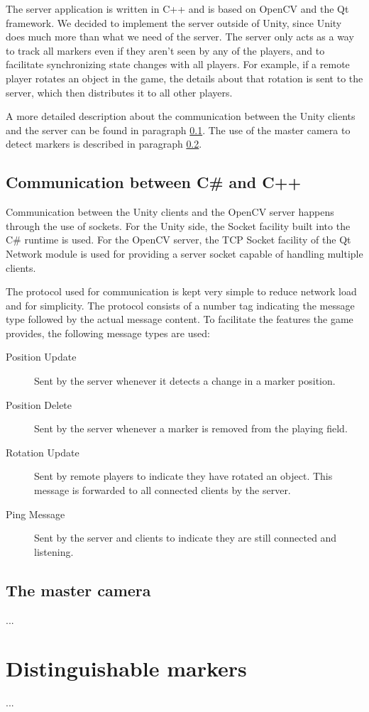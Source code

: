         The server application is written in C++ and is based on OpenCV and the 
        Qt framework. We decided to implement the server outside of Unity, since 
        Unity does much more than what we need of the server. The server only 
        acts as a way to track all markers even if they aren't seen by any of 
        the players, and to facilitate synchronizing state changes with all 
        players. For example, if a remote player rotates an object in the game, 
        the details about that rotation is sent to the server, which then 
        distributes it to all other players.
        
        A more detailed description about the communication between the Unity 
        clients and the server can be found in paragraph \ref{ssec:communication}.
        The use of the master camera to detect markers is described in paragraph
        \ref{ssec:mastercamera}.
         		
		\subsection{Communication between C\# and C++} \label{ssec:communication}
			Communication between the Unity clients and the OpenCV server 
            happens through the use of sockets. For the Unity side, the Socket 
            facility built into the C\# runtime is used. For the OpenCV server, 
            the TCP Socket facility of the Qt Network module is used for 
            providing a server socket capable of handling multiple clients. 
            
            The protocol used for communication is kept very simple to reduce 
            network load and for simplicity. The protocol consists of a number
            tag indicating the message type followed by the actual message 
            content. To facilitate the features the game provides, the following
            message types are used:
            
            \begin{description}
                \item[Position Update] Sent by the server whenever it detects a 
                                       change in a marker position.
                \item[Position Delete] Sent by the server whenever a marker is
                                       removed from the playing field.
                \item[Rotation Update] Sent by remote players to indicate they 
                                       have rotated an object. This message is 
                                       forwarded to all connected clients by the
                                       server.
                \item[Ping Message]    Sent by the server and clients to indicate 
                                       they are still connected and listening.
            \end{description}
		
		\subsection{The master camera} \label{ssec:mastercamera}
			...
			
	\section{Distinguishable markers} \label{sec:markers}
		...